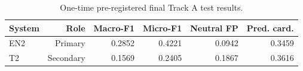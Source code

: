 \begin{table}[t]
\centering
\small
\caption{One-time pre-registered final Track A test results.}
\label{tab:final}
\begin{tabular}{lrrrrr}
\toprule
System & Role & Macro-F1 & Micro-F1 & Neutral FP & Pred. card. \\
\midrule
EN2 & Primary & 0.2852 & 0.4221 & 0.0942 & 0.3459 \\
T2 & Secondary & 0.1569 & 0.2405 & 0.1867 & 0.3616 \\
\bottomrule
\end{tabular}
\end{table}
